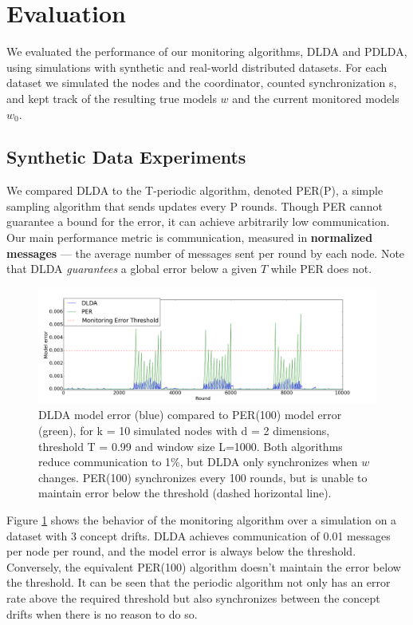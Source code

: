 \documentclass{sig-alternate-05-2015}
\begin{document}
\section{Evaluation}
We evaluated the performance of our monitoring algorithms,
DLDA and PDLDA, using simulations with synthetic and real-world 
distributed datasets. 
For each dataset we simulated the nodes and the coordinator, 
counted synchronization s, and kept track of the resulting true models $w$ and the
current monitored models $w_0$. 
\subsection{Synthetic Data Experiments}
We compared DLDA to the T-periodic algorithm, denoted
PER(P), a simple sampling algorithm that sends updates
every P rounds. Though PER cannot guarantee a bound for the
error, it can achieve arbitrarily low communication.
Our main performance metric is communication, measured
in \textbf{normalized messages} --- the average number of messages sent per
round by each node. Note that DLDA \textit{guarantees}
a global error below a given $T$ while PER does not.

\begin{figure}[ht]
	\centering
	\includegraphics[width=\textwidth]{PER/PERvsDLDAoverTime.png}
	\caption{ DLDA model error (blue) compared to PER(100) model error (green), 
	for k = 10 simulated nodes with d = 2 dimensions, threshold T = 0.99 and
	window size L=1000. Both algorithms reduce communication to 1\%, but DLDA
	only synchronizes when $w$ changes. PER(100) synchronizes every 100 rounds, 
	but is unable to maintain error below the threshold (dashed horizontal line).}
	\label{PERvsDLDAoverTime}
\end{figure}
	
Figure \ref{PERvsDLDAoverTime} shows the behavior of the monitoring 
algorithm over a simulation on a dataset with 3 concept drifts. 
DLDA achieves communication of 0.01 messages per node per round, and 
the model error is always below the threshold. 
Conversely, the equivalent PER(100) algorithm doesn't maintain the
error below the threshold. 
It can be seen that the periodic algorithm 
not only has an error rate above the required threshold but also
synchronizes between the concept drifts when there is no reason to do so.
\end{document}
